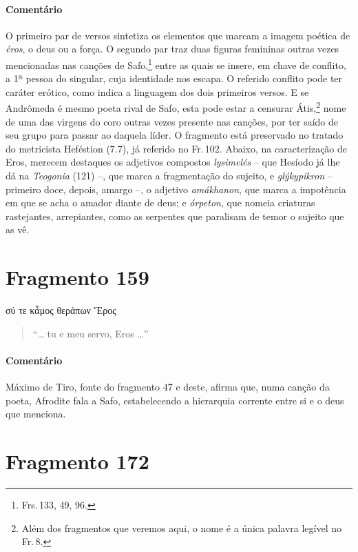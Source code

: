 \pagebreak
{\paragraph{Comentário} O primeiro par de versos sintetiza os elementos que marcam a imagem poética de
\textit{éros}, o deus ou a força. O segundo par traz duas figuras femininas
outras vezes mencionadas nas canções de Safo,\footnote{Frs.\,133, 49, 96.} entre
as quais se insere, em chave de conflito, a 1ª pessoa do singular, cuja
identidade nos escapa. O referido conflito pode ter caráter
erótico, como indica a linguagem dos dois primeiros versos. E se Andrômeda é mesmo poeta rival de Safo, esta pode estar a censurar Átis,\footnote{Além dos fragmentos que veremos aqui, o nome é a única palavra legível no Fr.\,8.} nome de uma das virgens do coro outras vezes presente nas canções, por ter saído de seu grupo para passar ao daquela líder. O fragmento está preservado no tratado do metricista Heféstion (7.7), já
referido no Fr.\,102.
Abaixo, na caracterização de Eros, merecem destaques os adjetivos  compostos \textit{lysimelés} -- que Hesíodo já lhe dá na \textit{Teogonia} (121) --, que marca a fragmentação do sujeito, e \textit{glýkypikron} -- primeiro doce, depois, amargo --, o adjetivo \textit{amákhanon}, que marca a impotência em que se acha o amador diante de deus; e \textit{órpeton}, que nomeia criaturas rastejantes, arrepiantes, como as serpentes que paralisam de temor o sujeito que as vê.}


\pagebreak
\section{Fragmento 159}

\begin{gkverse}
σύ τε κἆμος θεράπων Ἔρος
\end{gkverse}

\begin{verse}
``\ldots{} tu e meu servo, Eros \ldots{}''
\end{verse}

\medskip

{\paragraph{Comentário} Máximo de Tiro, fonte do fragmento 47 e deste, afirma que, numa canção da poeta,
Afrodite fala a Safo, estabelecendo a hierarquia corrente entre si e o deus que
menciona.}

\section{Fragmento 172}

